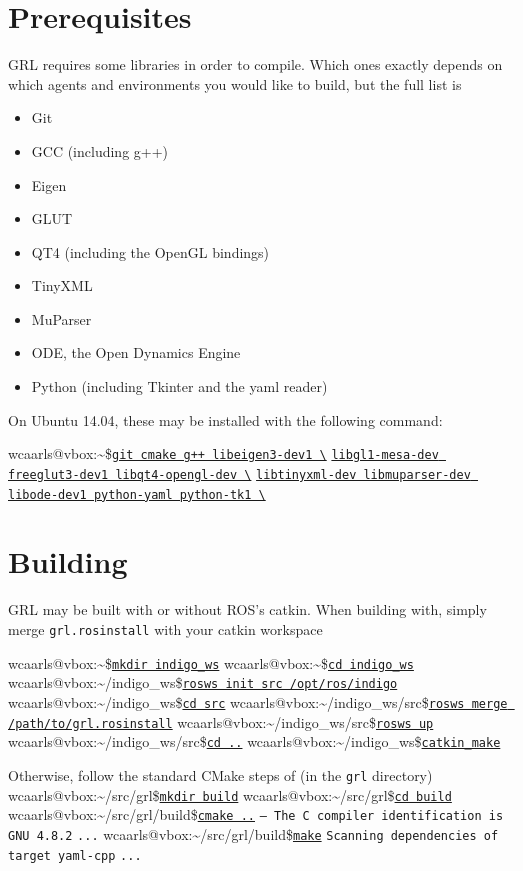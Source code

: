 \documentclass{article}
\makeatletter
\newcommand{\inp}[1]{\texttt{\underline{#1}}}
\newcommand{\txt}[1]{\texttt{#1}}
\newcommand{\promptm}{wcaarls@vbox:\~{}/src/grl\$\xspace}
\newcommand{\promptmb}{wcaarls@vbox:\~{}/src/grl/build\$\xspace}
\newcommand{\prompt}{wcaarls@vbox:\~{}\$\xspace}
\newcommand{\prompth}{wcaarls@vbox:\~{}/indigo\_ws\$\xspace}
\newcommand{\prompths}{wcaarls@vbox:\~{}/indigo\_ws/src\$\xspace}
\newenvironment{code}{\alltt}{\endalltt}
\makeatother
\begin{document}
\section{Prerequisites}

GRL requires some libraries in order to compile. Which ones exactly depends
on which agents and environments you would like to build, but the full list
is

\begin{itemize}
  \item Git
  \item GCC (including g++)
  \item Eigen
  \item GLUT
  \item QT4 (including the OpenGL bindings)
  \item TinyXML
  \item MuParser
  \item ODE, the Open Dynamics Engine
  \item Python (including Tkinter and the yaml reader)
\end{itemize}

On Ubuntu 14.04, these may be installed with the following command:

\begin{code}
\prompt \inp{git cmake g++ libeigen3-dev1 \textbackslash}
\inp{libgl1-mesa-dev freeglut3-dev1 libqt4-opengl-dev \textbackslash}
\inp{libtinyxml-dev libmuparser-dev libode-dev1 python-yaml python-tk1 \textbackslash}
\end{code}

\section{Building}

GRL may be built with or without ROS's catkin. When building with, simply
merge \txt{grl.rosinstall} with your catkin workspace

\begin{code}
{\color{Gray}\prompt \inp{mkdir indigo\_ws}
\prompt \inp{cd indigo\_ws}
\prompth \inp{rosws init src /opt/ros/indigo}
\prompth \inp{cd src}}
\prompths \inp{rosws merge /path/to/grl.rosinstall} 
\prompths \inp{rosws up}
\prompths \inp{cd ..}
\prompth \inp{catkin\_make}
\end{code}

Otherwise, follow the standard CMake steps of (in the \txt{grl} directory)
\begin{code}
\promptm \inp{mkdir build}
\promptm \inp{cd build}
\promptmb \inp{cmake ..}
\txt{-- The C compiler identification is GNU 4.8.2}
\txt{...}
\promptmb \inp{make}
\txt{Scanning dependencies of target yaml-cpp}
\txt{...}
\end{code}
\end{document}
